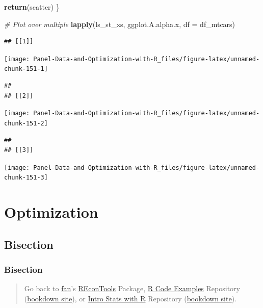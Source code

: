 \documentclass[
]{book}
\newenvironment{Shaded}{\begin{snugshade}}{\end{snugshade}}
\newcommand{\CommentTok}[1]{\textcolor[rgb]{0.56,0.35,0.01}{\textit{#1}}}
\newcommand{\DataTypeTok}[1]{\textcolor[rgb]{0.13,0.29,0.53}{#1}}
\newcommand{\KeywordTok}[1]{\textcolor[rgb]{0.13,0.29,0.53}{\textbf{#1}}}
\newcommand{\NormalTok}[1]{#1}
\begin{document}
\begin{Shaded}
\begin{Highlighting}[]
\KeywordTok{return}\NormalTok{(scatter)}
\NormalTok{\}}

\CommentTok{\# Plot over multiple}
\KeywordTok{lapply}\NormalTok{(ls\_st\_xs,}
\NormalTok{       ggplot.A.alpha.x,}
       \DataTypeTok{df =}\NormalTok{ df\_mtcars)}
\end{Highlighting}
\end{Shaded}

\begin{verbatim}
## [[1]]
\end{verbatim}

\begin{center}\texttt{[image: Panel-Data-and-Optimization-with-R\_files/figure-latex/unnamed-chunk-151-1]} \end{center}

\begin{verbatim}
## 
## [[2]]
\end{verbatim}

\begin{center}\texttt{[image: Panel-Data-and-Optimization-with-R\_files/figure-latex/unnamed-chunk-151-2]} \end{center}

\begin{verbatim}
## 
## [[3]]
\end{verbatim}

\begin{center}\texttt{[image: Panel-Data-and-Optimization-with-R\_files/figure-latex/unnamed-chunk-151-3]} \end{center}

\hypertarget{optimization}{%
\chapter{Optimization}\label{optimization}}

\hypertarget{bisection}{%
\section{Bisection}\label{bisection}}

\hypertarget{bisection-1}{%
\subsection{Bisection}\label{bisection-1}}

\begin{quote}
Go back to \href{http://fanwangecon.github.io/}{fan}'s \href{https://fanwangecon.github.io/REconTools/}{REconTools} Package, \href{https://fanwangecon.github.io/R4Econ/}{R Code Examples} Repository (\href{https://fanwangecon.github.io/R4Econ/bookdown}{bookdown site}), or \href{https://fanwangecon.github.io/Stat4Econ/}{Intro Stats with R} Repository (\href{https://fanwangecon.github.io/Stat4Econ/bookdown}{bookdown site}).
\end{quote}
\end{document}
